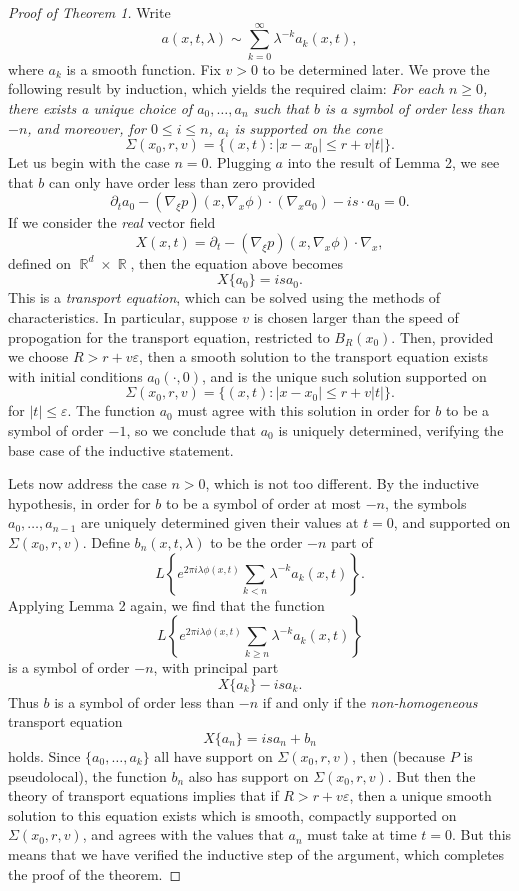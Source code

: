 \documentclass{article}
\theoremstyle{plain}
\theoremstyle{remark}
\theoremstyle{definition}
\DeclareMathOperator{\RR}{\mathbb{R}}
\begin{document}
\begin{proof}[Proof of Theorem 1]

Write
%
\[ a(x,t,\lambda) \sim \sum_{k = 0}^\infty \lambda^{-k} a_k(x,t), \]
%
where $a_k$ is a smooth function. Fix $v > 0$ to be determined later. We prove the following result by induction, which yields the required claim: \emph{For each $n \geq 0$, there exists a unique choice of $a_0, \dots, a_n$ such that $b$ is a symbol of order less than $-n$, and moreover, for $0 \leq i \leq n$, $a_i$ is supported on the cone}
%
\[ \Sigma(x_0,r,v) = \{ (x,t) : |x - x_0| \leq r + v |t| \}. \]
%
Let us begin with the case $n = 0$. Plugging $a$ into the result of Lemma 2, we see that $b$ can only have order less than zero provided
%
\[ \partial_t a_0 - (\nabla_\xi p)(x, \nabla_x \phi) \cdot (\nabla_x a_0) - i s \cdot a_0 = 0. \]
%
If we consider the \emph{real} vector field
%
\[ X(x,t) = \partial_t - (\nabla_\xi p)(x,\nabla_x \phi) \cdot \nabla_x, \]
%
defined on $\RR^d \times \RR$, then the equation above becomes
%
\[ X \{ a_0 \} = i s a_0. \]
%
This is a \emph{transport equation}, which can be solved using the methods of characteristics. In particular, suppose $v$ is chosen larger than the speed of propogation for the transport equation, restricted to $B_R(x_0)$. Then, provided we choose $R > r + v \varepsilon$, then a smooth solution to the transport equation exists with initial conditions $a_0(\cdot,0)$, and is the unique such solution supported on
%
\[ \Sigma(x_0,r,v) = \{ (x,t) : |x - x_0| \leq r + v |t| \}. \]
%
for $|t| \leq \varepsilon$. The function $a_0$ must agree with this solution in order for $b$ to be a symbol of order $-1$, so we conclude that $a_0$ is uniquely determined, verifying the base case of the inductive statement.

Lets now address the case $n > 0$, which is not too different. By the inductive hypothesis, in order for $b$ to be a symbol of order at most $-n$, the symbols $a_0, \dots, a_{n-1}$ are uniquely determined given their values at $t = 0$, and supported on $\Sigma(x_0,r,v)$. Define $b_n(x,t,\lambda)$ to be the order $-n$ part of
%
\[ L \left\{ e^{2 \pi i \lambda \phi(x,t)} \sum_{k < n} \lambda^{-k} a_k(x,t) \right\}. \]
%
Applying Lemma 2 again, we find that the function
%
\[ L \left\{ e^{2 \pi i \lambda \phi(x,t)} \sum_{k \geq n} \lambda^{-k} a_k(x,t) \right\} \]
%
is a symbol of order $-n$, with principal part
%
\[ X \{ a_k \} - i s a_k. \]
%
Thus $b$ is a symbol of order less than $-n$ if and only if the \emph{non-homogeneous} transport equation
%
\[ X \{ a_n \} = i s a_n + b_n \]
%
holds. Since $\{ a_0, \dots, a_k \}$ all have support on $\Sigma(x_0,r,v)$, then (because $P$ is pseudolocal), the function $b_n$ also has support on $\Sigma(x_0,r,v)$. But then the theory of transport equations implies that if $R > r + v \varepsilon$, then a unique smooth solution to this equation exists which is smooth, compactly supported on $\Sigma(x_0,r,v)$, and agrees with the values that $a_n$ must take at time $t = 0$. But this means that we have verified the inductive step of the argument, which completes the proof of the theorem.
\end{proof}
\end{document}
